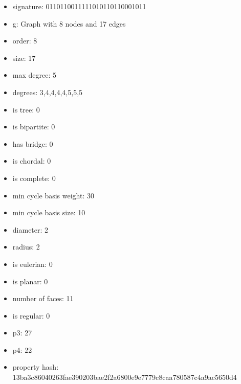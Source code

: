 \begin{itemize}
\item signature: 0110110011111010110110001011
\item g: Graph with 8 nodes and 17 edges
\item order: 8
\item size: 17
\item max degree: 5
\item degrees: 3,4,4,4,4,5,5,5
\item is tree: 0
\item is bipartite: 0
\item has bridge: 0
\item is chordal: 0
\item is complete: 0
\item min cycle basis weight: 30
\item min cycle basis size: 10
\item diameter: 2
\item radius: 2
\item is eulerian: 0
\item is planar: 0
\item number of faces: 11
\item is regular: 0
\item p3: 27
\item p4: 22
\item property hash: 13ba3c86040263fae390203bae2f2a6800e9e7779c8caa780587c4a9ac5650d4
\end{itemize}
\newpage
\begin{figure}
\end{figure}
